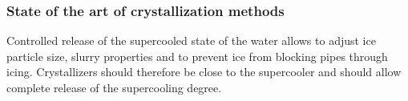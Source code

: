 \subsubsection{State of the art of crystallization methods}
Controlled release of the supercooled state of the water allows to adjust ice particle size, slurry properties and to prevent ice from blocking pipes through icing. Crystallizers should therefore be close to the supercooler and should allow complete release of the supercooling degree. 




\begin{comment}
Early crystallizing devices used the simple method of seeding or physical disturbances as supercooling release methods \citep{bedecarrats_supercooled_2000}. The used systems however had multiple drawbacks. Seeded methods fail to operate if the temperature of the system rises such that the initial seed crystal completely melts. A new seed crystal then has to be added to the system in order to start the controlled crystallization process again. Also, seed crystals might get flushed away if they are located inside a device in the pipe \citep{kristallisationseinheit_karlsruhe}. The early models using physical disturbances used to be open to the environment \citep{tanino_ice-water_2001}. Open systems suffer from added impurities from the surroundings, which can be a major drawback if foodstuff should be cooled with the slurry. Reproducibility is also lower with this kind of systems. \cite{saito_fundamental_1994} tested various methods like mechanical shock, rubbing of solid surfaced, electrical shocks, vibration, concluding that different kinds of shock may start nucleation with increased tendency for increased collision force. In the early 2000s, more sophisticated approaches used ultrasonic waves to start nucleation. This method allows controlled nucleation in closed pipes, is reported to prevent adhesion of ice in the are of the crystallizer and to allow adjustment of ice crystal size. This method requires some initial energy, but can be turned off as soon as enough present ice crystals can act as seed crystals. Recently, more research is directed to magnetic and electric disturbances to use for controlled nucleation \citep{dalvi-isfahan_review_2017}.
Main requirements for crystallizing devices seem to be the controlled and continuous crystallization, complete release of the supercooling degree of the fluid, prevention of upstream propagation of ice and a closed design to prevent impurities from entering the system. 

\end{comment}



